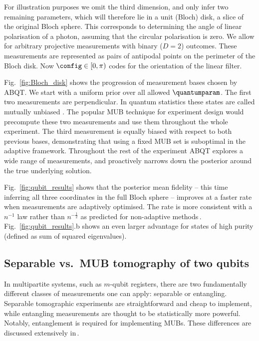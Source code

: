 For illustration purposes we omit the third dimension, and only infer two remaining parameters, which will therefore lie in a unit (Bloch) disk, a slice of the original Bloch sphere. This corresponds to determining the angle of linear polarisation of a photon, assuming that the circular polarisation is zero. We allow for arbitrary projective measurements with binary ($D = 2$) outcomes. These measurements are represented as pairs of antipodal points on the perimeter of the Bloch disk. Now $\config\in[0,\pi)$ codes for the orientation of the linear filter.
	
Fig.\ \ref{fig:Bloch_disk} shows the progression of measurement bases chosen by ABQT. We start with a uniform prior over all allowed $\quantumparam$. The first two measurements are perpendicular. In quantum statistics these states are called mutually unbiased \citep{MUBExperiment}. The popular MUB technique for experiment design would precompute these two measurements and use them throughout the whole experiment. The third measurement is equally biased with respect to both previous bases, demonstrating that using a fixed MUB set is suboptimal in the adaptive framework. Throughout the rest of the experiment ABQT explores a wide range of measurements, and proactively narrows down the posterior around the true underlying solution.

Fig.\ \ref{fig:qubit_results} shows that the posterior mean fidelity -- this time inferring all three coordinates in the full Bloch sphere -- improves at a faster rate when measurements are adaptively optimised. The rate is more consistent with a $n^{-1}$ law rather than $n^{-\frac{1}{2}}$ as predicted for non-adaptive methods\,\cite[][and refs.]{MUBExperiment}. Fig.\ \ref{fig:qubit_results}.b shows an even larger advantage for states of high purity (defined as sum of squared eigenvalues).

\subsection{Separable vs.\ MUB tomography of two qubits}

In multipartite systems, such as $m$-qubit registers, there are two fundamentally different classes of measurements one can apply: separable or entangling. Separable tomographic experiments are straightforward and cheap to implement, while entangling measurements are thought to be statistically more powerful. Notably, entanglement is required for implementing MUBs. These differences are discussed extensively in\,\citep{MUBExperiment}.

